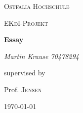 \documentclass[12pt]{scrartcl}
\begin{document}
\begin{titlepage}
	\centering
	{\scshape\LARGE Ostfalia Hochschule \par}
	\vspace{1cm}
	{\scshape\Large EKdI-Projekt\par}
	\vspace{1.5cm}
	{\huge\bfseries Essay\par}
	\vspace{2cm}
	{\Large\itshape Martin Krause 70478294\par}
	\vfill
	supervised by\par
	Prof. \textsc{Jensen}

	\vfill

	{\large \today\par}
\end{titlepage}
\end{document}

